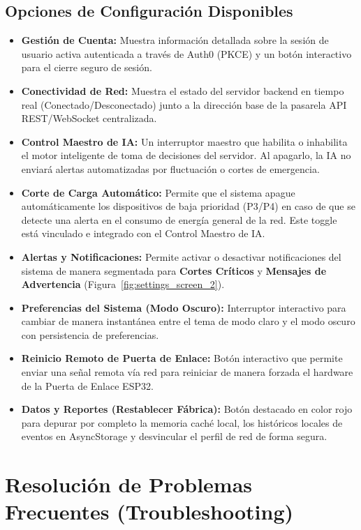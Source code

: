 \documentclass[11pt,a4paper]{article}
\begin{document}
\subsection{Opciones de Configuración Disponibles}
\begin{itemize}
    \item \textbf{Gestión de Cuenta:} Muestra información detallada sobre la sesión de usuario activa autenticada a través de Auth0 (PKCE) y un botón interactivo para el cierre seguro de sesión.
    \item \textbf{Conectividad de Red:} Muestra el estado del servidor backend en tiempo real (Conectado/Desconectado) junto a la dirección base de la pasarela API REST/WebSocket centralizada.
    \item \textbf{Control Maestro de IA:} Un interruptor maestro que habilita o inhabilita el motor inteligente de toma de decisiones del servidor. Al apagarlo, la IA no enviará alertas automatizadas por fluctuación o cortes de emergencia.
    \item \textbf{Corte de Carga Automático:} Permite que el sistema apague automáticamente los dispositivos de baja prioridad (P3/P4) en caso de que se detecte una alerta en el consumo de energía general de la red. Este toggle está vinculado e integrado con el Control Maestro de IA.
    \item \textbf{Alertas y Notificaciones:} Permite activar o desactivar notificaciones del sistema de manera segmentada para \textbf{Cortes Críticos} y \textbf{Mensajes de Advertencia} (Figura~\ref{fig:settings_screen_2}).
    \item \textbf{Preferencias del Sistema (Modo Oscuro):} Interruptor interactivo para cambiar de manera instantánea entre el tema de modo claro y el modo oscuro con persistencia de preferencias.
    \item \textbf{Reinicio Remoto de Puerta de Enlace:} Botón interactivo que permite enviar una señal remota vía red para reiniciar de manera forzada el hardware de la Puerta de Enlace ESP32.
    \item \textbf{Datos y Reportes (Restablecer Fábrica):} Botón destacado en color rojo para depurar por completo la memoria caché local, los históricos locales de eventos en AsyncStorage y desvincular el perfil de red de forma segura.
\end{itemize}

\section{Resolución de Problemas Frecuentes (Troubleshooting)}
\end{document}

